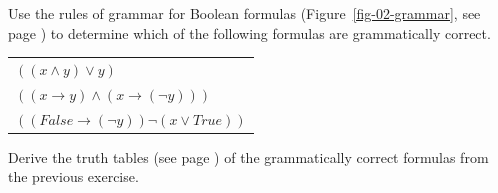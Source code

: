 \begin{ExerciseList}
\Exercise Use the rules of grammar for Boolean formulas (Figure~\ref{fig-02-grammar}, see page \pageref{fig-02-grammar})
to determine which of the following formulas are grammatically correct.
\begin{center}
\begin{tabular}{l}
$((x \wedge y) \vee y )$ \\
$((x \rightarrow y) \wedge (x \rightarrow (\neg y)))$ \\
$((False \rightarrow (\neg y)) \neg (x \vee True))$ \\
\end{tabular}
\end{center}

\Exercise Derive the truth tables (see page \pageref{truth-tables}) of the grammatically correct formulas from the previous exercise.


\end{ExerciseList}
